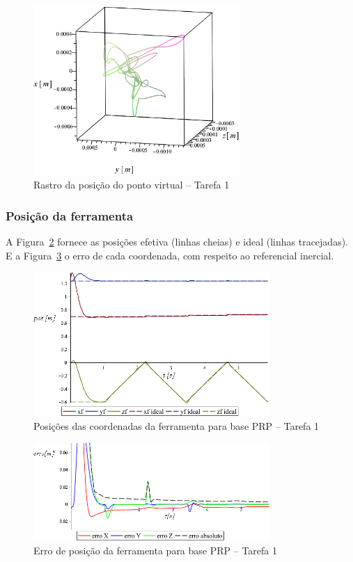 \begin{figure}[h!]
	\centering 
 	\includegraphics[width=0.70\textwidth]{figs/t1_pvirtural_base_prp}
 	\caption{Rastro da posição do ponto virtual -- Tarefa 1}
 	\label{fig::t1_pvirtural_base_prp}
\end{figure}


\subsubsection{Posição da ferramenta}

A Figura~\ref{fig::t1_posf_base_prp} fornece as posições efetiva (linhas cheias)
e ideal (linhas tracejadas). E a Figura~\ref{fig::t1_erroposf_base_prp} o erro
de cada coordenada, com respeito ao referencial inercial.

\begin{figure}[h!]
	\centering 
 	\includegraphics[width=0.80\textwidth]{figs/t1_posf_base_prp}
 	\caption{Posições das coordenadas da ferramenta para base PRP -- Tarefa
 	1}
 	\label{fig::t1_posf_base_prp}
\end{figure}

\begin{figure}[h!]
	\centering 
 	\includegraphics[width=0.80\textwidth]{figs/t1_erroposf_base_prp}
 	\caption{Erro de posição da ferramenta para base PRP -- Tarefa 1}
 	\label{fig::t1_erroposf_base_prp}
\end{figure}


